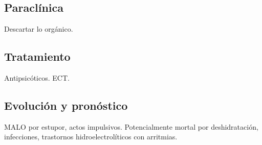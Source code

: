 \subsection*{Paraclínica}
Descartar lo orgánico.
\subsection*{Tratamiento}
Antipsicóticos. ECT.
\subsection*{Evolución y pronóstico}
MALO por estupor, actos impulsivos. Potencialmente mortal por deshidratación, infecciones, trastornos hidroelectrolíticos con arritmias.
